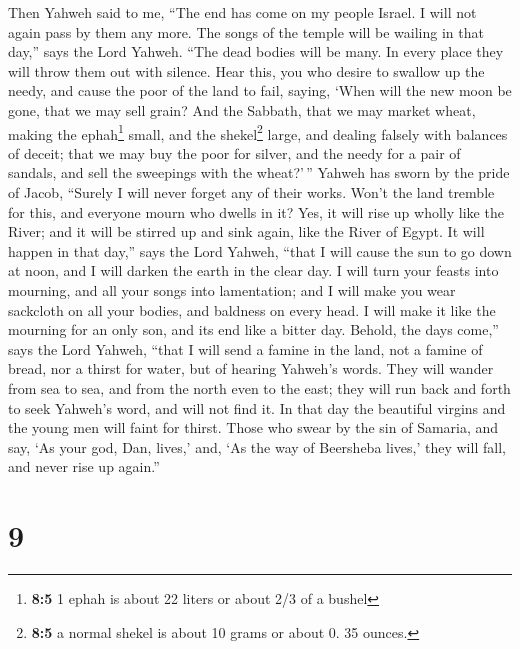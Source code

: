 Then Yahweh said to me, ``The end has come on my people Israel. I will
not again pass by them any more.  The songs of the temple
will be wailing in that day,'' says the Lord Yahweh. ``The dead bodies
will be many. In every place they will throw them out with silence.
 Hear this, you who desire to swallow up the needy, and
cause the poor of the land to fail,  saying, `When will
the new moon be gone, that we may sell grain? And the Sabbath, that we
may market wheat, making the ephah\footnote{\textbf{8:5} 1 ephah is
  about 22 liters or about 2/3 of a bushel} small, and the
shekel\footnote{\textbf{8:5} a normal shekel is about 10 grams or about
  0. 35 ounces.} large, and dealing falsely with balances of deceit;
 that we may buy the poor for silver, and the needy for a
pair of sandals, and sell the sweepings with the wheat?'\,''
 Yahweh has sworn by the pride of Jacob, ``Surely I will
never forget any of their works.  Won't the land tremble
for this, and everyone mourn who dwells in it? Yes, it will rise up
wholly like the River; and it will be stirred up and sink again, like
the River of Egypt.  It will happen in that day,'' says
the Lord Yahweh, ``that I will cause the sun to go down at noon, and I
will darken the earth in the clear day.  I will turn your
feasts into mourning, and all your songs into lamentation; and I will
make you wear sackcloth on all your bodies, and baldness on every head.
I will make it like the mourning for an only son, and its end like a
bitter day.  Behold, the days come,'' says the Lord
Yahweh, ``that I will send a famine in the land, not a famine of bread,
nor a thirst for water, but of hearing Yahweh's words. 
They will wander from sea to sea, and from the north even to the east;
they will run back and forth to seek Yahweh's word, and will not find
it.  In that day the beautiful virgins and the young men
will faint for thirst.  Those who swear by the sin of
Samaria, and say, `As your god, Dan, lives,' and, `As the way of
Beersheba lives,' they will fall, and never rise up again.''

\hypertarget{section-8}{%
\section{9}\label{section-8}}

